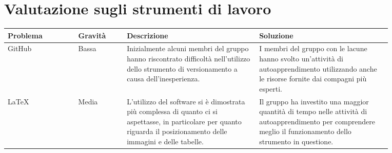 \section{Valutazione sugli strumenti di lavoro}
\begin{center}
    \renewcommand{\arraystretch}{1.25}
    \begin{table}[H]
        \centering
        \begin{longtable}{|p{0.16\linewidth}|p{0.11\linewidth}|p{0.3\linewidth}|p{0.3\linewidth}|}
        \hline
        \rowcolor[HTML]{036400}
        {\color[HTML]{EFEFEF} \textbf{Problema}} & {\color[HTML]{EFEFEF} \textbf{Gravità}} & {\color[HTML]{EFEFEF} \textbf{Descrizione}} & {\color[HTML]{EFEFEF} \textbf{Soluzione}} \\ \hline
        \rowcolor[HTML]{EFEFEF}
        GitHub & Bassa & Inizialmente alcuni membri del gruppo hanno riscontrato difficoltà nell'utilizzo dello strumento di versionamento a causa dell'inesperienza. & I membri del gruppo con le lacune hanno svolto un'attività di autoapprendimento utilizzando anche le risorse fornite dai compagni più esperti. \\ \hline
        \rowcolor[HTML]{C0C0C0}
        \LaTeX & Media & L'utilizzo del software si è dimostrata più complessa di quanto ci si aspettasse, in particolare per quanto riguarda il posizionamento delle immagini e delle tabelle. & Il gruppo ha investito una maggior quantità di tempo nelle attività di autoapprendimento per comprendere meglio il funzionamento dello strumento in questione. \\ \hline
        \end{longtable}
    \end{table}
\end{center}